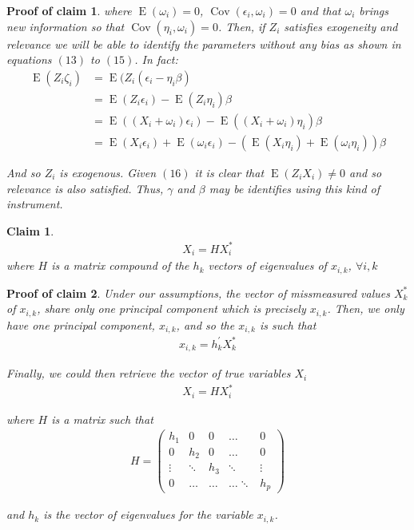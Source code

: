 \documentclass[10pt]{article}
\newtheorem{claim}{Claim}
\newtheorem{claimproof}{Proof of claim}[claim]
\def\b{\beta}
\begin{document}
\begin{claimproof}
        where $\operatorname{E}(\omega_i)=0$, $\operatorname{Cov}(\epsilon_i,\omega_i)=0$ and that $\omega_i$ brings new information so that $\operatorname{Cov}(\eta_i,\omega_i)=0$. Then, if $Z_i$ satisfies exogeneity and relevance we will be able to identify the parameters without any bias as shown in equations $(13)$ to $(15)$. In fact:
        \begin{align}
            \operatorname{E}(Z_i\zeta_i)&=\operatorname{E}(Z_i(\epsilon_i-\eta_i\b)\\
            &=\operatorname{E}(Z_i\epsilon_i)-\operatorname{E}(Z_i\eta_i)\b\\
           &= \operatorname{E}((X_i+\omega_i)\epsilon_i)-\operatorname{E}((X_i+\omega_i)\eta_i)\b \\
           &=\operatorname{E}(X_i\epsilon_i) + \operatorname{E}(\omega_i\epsilon_i)-(\operatorname{E}(X_i\eta_i)+\operatorname{E}(\omega_i\eta_i))\b
        \end{align}
        
        And so $Z_i$ is exogenous. Given $(16)$ it is clear that $\operatorname{E}(Z_iX_i)\neq0$ and so relevance is also satisfied. Thus, $\gamma$ and $\b$ may be identifies using this kind of instrument.

\end{claimproof}

\begin{claim}
\begin{align}
            X_i=HX^*_i
        \end{align}
where $H$ is a matrix compound of the $h_k$ vectors of eigenvalues of $x_{i,k}$, $\forall i,k$
\end{claim}

\begin{claimproof}
Under our assumptions, the vector of missmeasured values $X^*_k$ of $x_{i,k}$, share only one principal component which is precisely $x_{i,k}$. Then, we only have one principal component, $x_{i,k}$, and so the $x_{i,k}$ is such that
        \begin{align}
            x_{i,k}=h_{k}^{\prime} X^*_k
        \end{align}
        
        Finally, we could then retrieve the vector of true variables $X_i$
        \begin{align}
            X_i=HX^*_i
        \end{align}
        
        where $H$ is a matrix such that
        \begin{align*}
            H=\left(\begin{array}{ccccc}
        h_1 & 0 & 0 & \dots & 0 \\
        0 & h_2 & 0 & \dots & 0 \\
        \vdots & \ddots & h_3 & \ddots & \vdots \\
        0 & \dots & \dots & \dots \ddots & h_p
        \end{array}\right)
        \end{align*}
        
        and $h_k$ is the vector of eigenvalues for the variable $x_{i,k}$.
\end{claimproof}
\end{document}
